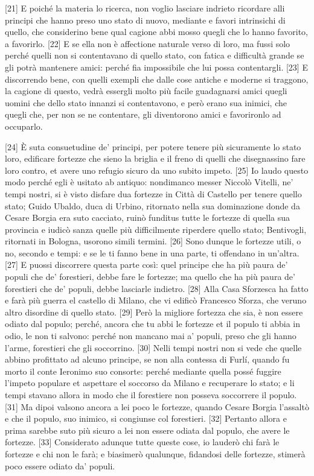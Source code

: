 {[}21{]} E poiché la materia lo ricerca, non voglio lasciare indrieto
ricordare alli principi che hanno preso uno stato di nuovo, mediante e
favori intrinsichi di quello, che considerino bene qual cagione abbi
mosso quegli che lo hanno favorito, a favorirlo. {[}22{]} E se ella non
è affectione naturale verso di loro, ma fussi solo perché quelli non si
contentavano di quello stato, con fatica e difficultà grande se gli
potrà mantenere amici: perché fia impossibile che lui possa
contentargli. {[}23{]} E discorrendo bene, con quelli exempli che dalle
cose antiche e moderne si traggono, la cagione di questo, vedrà essergli
molto più facile guadagnarsi amici quegli uomini che dello stato innanzi
si contentavono, e però erano sua inimici, che quegli che, per non se ne
contentare, gli diventorono amici e favorironlo ad occuparlo.

{[}24{]} È suta consuetudine de' principi, per potere tenere più
sicuramente lo stato loro, edificare fortezze che sieno la briglia e il
freno di quelli che disegnassino fare loro contro, et avere uno refugio
sicuro da uno subito impeto. {[}25{]} Io laudo questo modo perché egli è
usitato ab antiquo: nondimanco messer Niccolò Vitelli, ne' tempi nostri,
si è visto disfare dua fortezze in Città di Castello per tenere quello
stato; Guido Ubaldo, duca di Urbino, ritornato nella sua dominazione
donde da Cesare Borgia era suto cacciato, ruinò funditus tutte le
fortezze di quella sua provincia e iudicò sanza quelle più difficilmente
riperdere quello stato; Bentivogli, ritornati in Bologna, usorono simili
termini. {[}26{]} Sono dunque le fortezze utili, o no, secondo e tempi:
e se le ti fanno bene in una parte, ti offendano in un'altra. {[}27{]} E
puossi discorrere questa parte così: quel principe che ha più paura de'
populi che de' forestieri, debbe fare le fortezze; ma quello che ha più
paura de' forestieri che de' populi, debbe lasciarle indietro. {[}28{]}
Alla Casa Sforzesca ha fatto e farà più guerra el castello di Milano,
che vi edificò Francesco Sforza, che veruno altro disordine di quello
stato. {[}29{]} Però la migliore fortezza che sia, è non essere odiato
dal populo; perché, ancora che tu abbi le fortezze et il populo ti abbia
in odio, le non ti salvono: perché non mancano mai a' populi, preso che
gli hanno l'arme, forestieri che gli soccorrino. {[}30{]} Nelli tempi
nostri non si vede che quelle abbino profittato ad alcuno principe, se
non alla contessa di Furlí, quando fu morto il conte Ieronimo suo
consorte: perché mediante quella possé fuggire l'impeto populare et
aspettare el soccorso da Milano e recuperare lo stato; e li tempi
stavano allora in modo che il forestiere non posseva soccorrere il
populo. {[}31{]} Ma dipoi valsono ancora a lei poco le fortezze, quando
Cesare Borgia l'assaltò e che il populo, suo inimico, si congiunse col
forestieri. {[}32{]} Pertanto allora e prima sarebbe suto più sicuro a
lei non essere odiata dal populo, che avere le fortezze. {[}33{]}
Considerato adunque tutte queste cose, io lauderò chi farà le fortezze e
chi non le farà; e biasimerò qualunque, fidandosi delle fortezze,
stimerà poco essere odiato da' populi.

